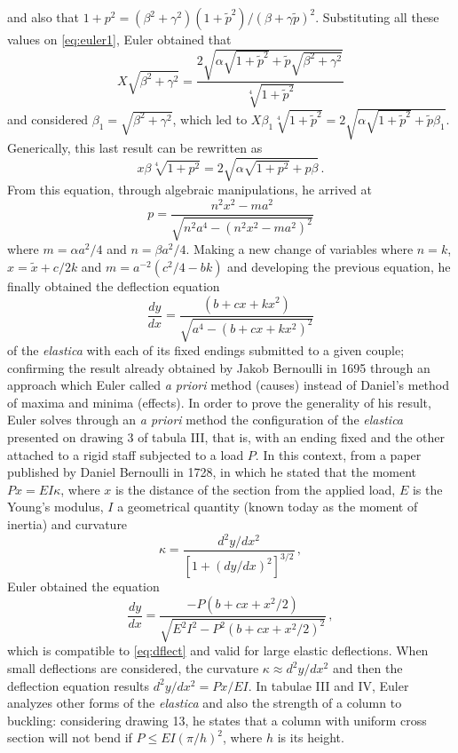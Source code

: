and also that $1+p^2 = (\beta^2+\gamma^2)(1+\tilde{p}^2)/(\beta+\gamma\tilde{p})^2$. Substituting all these values on \eqref{eq:euler1}, Euler obtained that
\begin{equation*}
X\sqrt{\beta^2+\gamma^2} = \dfrac{2\sqrt{\alpha\sqrt{1+\tilde{p}^2}+ \tilde{p}\sqrt{\beta^2+\gamma^2}}}{\sqrt[4]{1+\tilde{p}^2}}
\end{equation*}
and considered $\beta_1=\sqrt{\beta^2+\gamma^2}$, which led to $X\beta_1\sqrt[4]{1+\tilde{p}^2} = 2\sqrt{\alpha\sqrt{1+\tilde{p}^2}+ \tilde{p}\beta_1}$. Generically, this last result can be rewritten as 
\begin{equation*}
x\beta\sqrt[4]{1+p^2} = 2\sqrt{\alpha\sqrt{1+p^2}+ p\beta}\,.
\end{equation*}
From this equation, through algebraic manipulations, he arrived at
\begin{equation*}
p=\dfrac{n^2x^2-ma^2}{\sqrt{n^2a^4-(n^2x^2-ma^2)^2}}
\end{equation*}
where $m=\alpha a^2/4$ and $n=\beta a^2/4$. Making a new change of variables where $n=k$, $x=\tilde{x}+c/2k$ and $m=a^{-2}(c^2/4-bk)$ and developing the previous equation, he finally obtained the deflection equation  
\begin{equation}\label{eq:dflect}
\dfrac{dy}{dx}=\dfrac{(b+c x+k x^2)}{\sqrt{a^4-(b+c x+kx^2)^2}}
\end{equation}
of the \emph{elastica} with each of its fixed endings submitted to a given couple; confirming the result already obtained by Jakob Bernoulli in 1695 through an approach which Euler called \emph{a priori} method (causes) instead of Daniel's method of maxima and minima (effects). In order to prove the generality of his result, Euler solves through an \emph{a priori} method the configuration of the \emph{elastica} presented on drawing 3 of tabula III, that is, with an ending fixed and the other attached to a rigid staff subjected to a load $P$. In this context, from a paper published by Daniel Bernoulli in 1728, in which he stated that the moment $Px=EI\kappa$, where $x$ is the distance of the section from the applied load, $E$ is the Young's modulus, $I$ a geometrical quantity (known today as the moment of inertia) and curvature 
\begin{equation*}
\kappa=\dfrac{d^2y/dx^2}{[1+({dy}/{dx})^2]^{3/2}}\,,
\end{equation*}
Euler obtained the equation
\begin{equation*}
\dfrac{dy}{dx}=\dfrac{-P(b+c x+x^2/2)}{\sqrt{E^2I^2-P^2(b+c x+x^2/2)^2}}\,,
\end{equation*}
which is compatible to \eqref{eq:dflect} and valid for large elastic deflections. When small deflections are considered, the curvature $\kappa \approx d^2y/dx^2$ and then the deflection equation results $d^2y/dx^2=Px/EI$. In tabulae III and IV, Euler analyzes other forms of the \emph{elastica} and also the strength of a column to buckling: considering drawing 13, he states that a column with uniform cross section will not bend if $P\leqslant EI(\pi/h)^2$, where $h$ is its height.        

